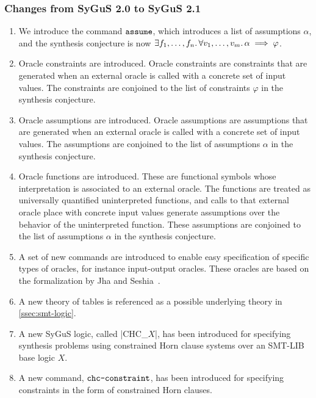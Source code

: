 \documentclass[english,a4paper,10pt]{article}
\begin{document}
\subsubsection{Changes from SyGuS 2.0 to SyGuS 2.1}
\begin{enumerate}
\item We introduce the command $\texttt{assume}$, which introduces a list of assumptions $\alpha$, and the 
synthesis conjecture is now 
$\exists f_1, \ldots, f_n \ldotp \forall v_1, \ldots, v_m \ldotp \alpha \implies \varphi$. 

\item Oracle constraints are introduced. Oracle constraints are constraints that are generated when an external oracle is called with a concrete set of input values. The constraints are conjoined to the list of constraints $\varphi$ in the synthesis conjecture.

\item Oracle assumptions are introduced. Oracle assumptions are assumptions that are generated when an external oracle is called with a concrete set of input values. The assumptions are conjoined to the list of assumptions $\alpha$ in the synthesis conjecture.

\item Oracle functions are introduced. These are functional symbols whose interpretation is associated to an external oracle. The functions are treated as universally quantified uninterpreted functions, and calls to that external oracle place with concrete input values generate assumptions over the behavior of the uninterpreted function. These assumptions are conjoined to the list of assumptions $\alpha$ in the synthesis conjecture.

\item A set of new commands are introduced to enable easy specification of specific types of oracles, for instance input-output oracles. These oracles are based on the formalization by Jha and Seshia~\cite{oracles}.

\item A new theory of tables is referenced as a possible underlying theory in \cref{ssec:smt-logic}.

\item A new SyGuS logic, called \code|CHC_$X$|,
has been introduced for specifying synthesis problems using constrained Horn clause systems
over an SMT-LIB base logic $X$.

\item A new command, $\texttt{chc-constraint}$, has been introduced for specifying constraints in the form of constrained Horn clauses.


\end{enumerate}
\end{document}
